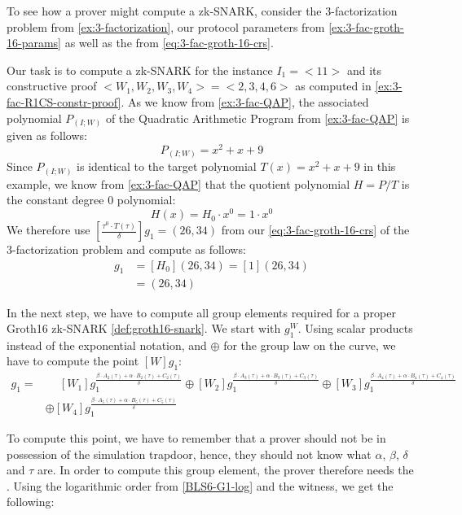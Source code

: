 \begin{example}\label{3-fac-snark-compute} To see how a prover might compute 
a zk-SNARK, consider the $3$-factorization problem from \examplename{} \ref{ex:3-factorization}, our protocol parameters from \examplename{} \ref{ex:3-fac-groth-16-params} as well as the  from \eqref{eq:3-fac-groth-16-crs}.

Our task is to compute a zk-SNARK for the instance $I_1=<11>$ and its constructive proof $<W_1,W_2,W_3,W_4>=<2,3,4,6>$ as computed in \examplename{} \ref{ex:3-fac-R1CS-constr-proof}. As we know from \examplename{} \ref{ex:3-fac-QAP}, the associated polynomial $P_{(I;W)}$ of the Quadratic Arithmetic Program from \examplename{} \ref{ex:3-fac-QAP} is given as follows:
$$
P_{(I;W)} = x^2 + x + 9
$$ 
Since $P_{(I;W)}$ is identical to the target polynomial $T(x)=x^2+x + 9$ in this example, we know from \examplename{} \ref{ex:3-fac-QAP} that the quotient polynomial $H=P/T$ is the constant degree $0$ polynomial:
$$
H(x)= H_0 \cdot x^0 = 1 \cdot x^0
$$
We therefore use $[\frac{\tau^0\cdot T(\tau)}{\delta}]g_1=(26,34)$ from our  \eqref{eq:3-fac-groth-16-crs} of the $3$-factorization problem and compute as follows:
\begin{align*}
[\frac{H(\tau)\cdot T(\tau)}{\delta}]g_1 &= [H_0](26,34)=[1](26,34)\\
                                   &= (26,34)
\end{align*}

In the next step, we have to compute all group elements required for a proper Groth16 zk-SNARK \eqref{def:groth16-snark}. We start with $g_1^W$. Using scalar products instead of the exponential notation, and $\oplus$ for the group law on the  curve, we have to compute the point $[W]g_1$:
\begin{align*}
[W]g_1 = & \phantom{\oplus} [W_1] g_1^{\frac{\beta\cdot A_{2}(\tau)+\alpha\cdot B_{2}(\tau)+C_{2}(\tau)}{\delta}}
        \oplus [W_2] g_1^{\frac{\beta\cdot A_{3}(\tau)+\alpha\cdot B_{3}(\tau)+C_{3}(\tau)}{\delta}}        
         \oplus [W_3] g_1^{\frac{\beta\cdot A_{4}(\tau)+\alpha\cdot B_{4}(\tau)+C_{4}(\tau)}{\delta}}\\        
         &\oplus [W_4] g_1^{\frac{\beta\cdot A_{5}(\tau)+\alpha\cdot B_{5}(\tau)+C_{5}(\tau)}{\delta}}
\end{align*}

To compute this point, we have to remember that a prover should not be in possession of the simulation trapdoor, hence, they should not know what $\alpha$, $\beta$, $\delta$ and $\tau$ are. In order to compute this group element, the prover therefore needs the . Using the logarithmic order from \ref{BLS6-G1-log} and the witness, we get the following:


\end{example}
